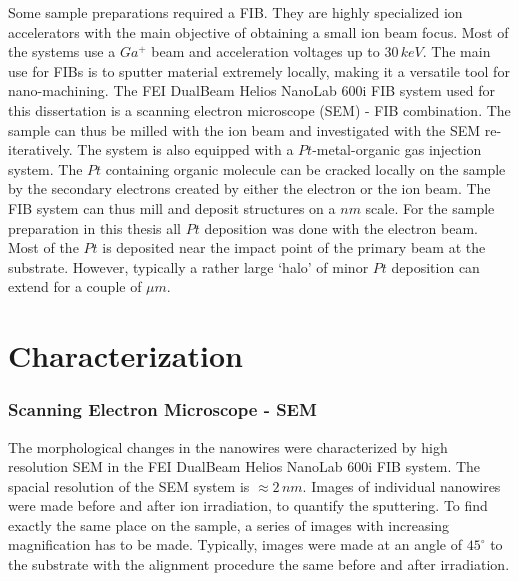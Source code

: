 Some sample preparations required a FIB. They are highly specialized ion accelerators with the main objective of obtaining a small ion beam focus. Most of the systems use a $Ga^+$ beam and acceleration voltages up to $30\,keV$. The main use for FIBs is to sputter material extremely locally, making it a versatile tool for nano-machining. The FEI DualBeam Helios NanoLab 600i FIB system used for this dissertation is a scanning electron microscope (SEM) - FIB combination. The sample can thus be milled with the ion beam and investigated with the SEM re-iteratively. The system is also equipped with a $Pt$-metal-organic gas injection system. The $Pt$ containing organic molecule can be cracked locally on the sample by the secondary electrons created by either the electron or the ion beam. The FIB system can thus mill and deposit structures on a $nm$ scale. For the sample preparation in this thesis all $Pt$ deposition was done with the electron beam. Most of the $Pt$ is deposited near the impact point of the primary beam at the substrate. However, typically a rather large `halo' of minor $Pt$ deposition can extend for a couple of $\mu m$. 

\section{Characterization}

\subsubsection{Scanning Electron Microscope - SEM}

The morphological changes in the nanowires were characterized by high resolution SEM in the FEI DualBeam Helios NanoLab 600i FIB system. The spacial resolution of the SEM system is $\approx 2\,nm$. Images of individual nanowires were made before and after ion irradiation, to quantify the sputtering. To find exactly the same place on the sample, a series of images with increasing magnification has to be made. Typically, images were made at an angle of $45^\circ$ to the substrate with the alignment procedure the same before and after irradiation.

